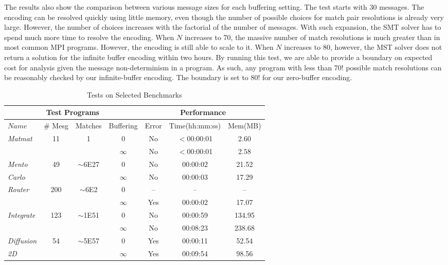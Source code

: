 The results also show the comparison between various message sizes for each buffering setting. The test starts with $30$ messages. The encoding can be resolved quickly using little memory, even though the number of possible choices for match pair resolutions is already very large. However, the number of choices increases with the factorial of the number of messages. With such expansion, the SMT solver has to spend much more time to resolve the encoding. When $\mathit{N}$ increases to 70, the massive number of match resolutions is much greater than in most common MPI programs. However, the encoding is still able to scale to it. When $\mathit{N}$ increases to 80, however, the MST solver does not return a solution for the infinite buffer encoding within two hours. By running this test, we are able to provide a boundary on expected cost for analysis given the message non-determinism in a program. As such, any program with less than 70! possible match resolutions can be reasonably checked by our infinite-buffer encoding. The boundary is set to 80! for our zero-buffer encoding.

\begin{table*}[t]
\begin{center}
\scriptsize
\caption{Tests on Selected Benchmarks}\label{table:benchmarks}
\begin{tabular}{|l|c|c|c|c|c|c|}
		\hline
         \multicolumn{4}{|c|}{Test Programs} & \multicolumn{3}{|c|}{Performance} \\ \hline
          $Name$&\# Mesg&Matches&Buffering&Error&Time(hh:mm:ss)&Mem(MB) \\ \hline
           \textit{Matmat} & 11 & 1 & 0 & No & $<$00:00:01 & 2.60\\
          	      & & & $\infty$ & No & $<$00:00:01 & 2.58\\ \hline
	 \textit{Mento} & 49 & $\sim$6E27 & 0 & No & 00:00:02 & 21.52\\
          \textit{Carlo}  & & & $\infty$ & No & 00:00:03 & 17.29 \\ \hline
	 \textit{Router}   & 200 & $\sim$6E2 & 0 & -- & -- & --\\
          	      & & & $\infty$ & Yes & 00:00:02 & 17.07 \\ \hline
	 \textit{Integrate}  & 123 & $\sim$1E51 & 0 & No & 00:00:59 & 134.95 \\
          	      & & &  $\infty$ & No & 00:08:23 & 238.68\\ \hline
	  \textit{Diffusion}  & 54 & $\sim$5E57 & 0 & Yes & 00:00:11 & 52.54 \\
           \textit{2D} &  & & $\infty$ & Yes & 00:09:54 & 98.56\\ \hline          
          		\end{tabular}
\end{center}
\end{table*}

